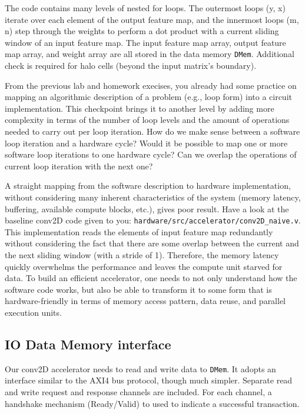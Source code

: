 \documentclass[11pt]{article}
\begin{document}
The code contains many levels of nested for loops. The outermost loops (y, x) iterate over each element of the output feature map, and the innermost loops (m, n) step through the weights to perform a dot product with a current sliding window of an input feature map. The input feature map array, output feature map array, and weight array are all stored in the data memory \texttt{DMem}. Additional check is required for halo cells (beyond the input matrix's boundary).

From the previous lab and homework execises, you already had some practice on mapping an algorithmic description of a problem (e.g., loop form) into a circuit implementation. This checkpoint brings it to another level by adding more complexity in terms of the number of loop levels and the amount of operations needed to carry out per loop iteration. How do we make sense between a software loop iteration and a hardware cycle? Would it be possible to map one or more software loop iterations to one hardware cycle? Can we overlap the operations of current loop iteration with the next one?

A straight mapping from the software description to hardware implementation, without considering many inherent characteristics of the system (memory latency, buffering, available compute blocks, etc.), gives poor result. Have a look at the baseline conv2D code given to you: \verb|hardware/src/accelerator/conv2D_naive.v|. This implementation reads the elements of input feature map redundantly without considering the fact that there are some overlap between the current and the next sliding window (with a stride of 1). Therefore, the memory latency quickly overwhelms the performance and leaves the compute unit starved for data. To build an efficient accelerator, one needs to not only understand how the software code works, but also be able to transform it to some form that is hardware-friendly in terms of memory access pattern, data reuse, and parallel execution units.

\subsection{IO Data Memory interface}

Our conv2D accelerator needs to read and write data to \texttt{DMem}. It adopts an interface similar to the AXI4 bus protocol, though much simpler. Separate read and write request and response channels are included. For each channel, a handshake mechanism (Ready/Valid) to used to indicate a successful transaction.
\end{document}
